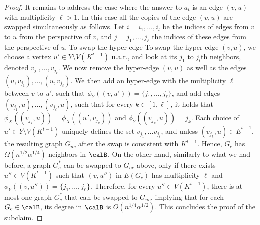\begin{proof}
      It remains to address the case where the answer to $a_t$ is an edge $(v,u)$ with multiplicity $\ell>1$. 
      In this case all the copies of the edge $(v,u)$ are swapped simultaneously as follows. Let $i=i_1, \ldots, i_l$ be the indices of edges from $v$ to $u$ from the perspective of $v$, and $j=j_1, \ldots, j_{\ell}$ the indices of these edges from the perspective of $u$. To swap the hyper-edge To swap the hyper-edge $(v,u)$, we choose a vertex $u'\in Y\setminus V(K^{t-1})$ u.a.r., and look at its $j_1$ to $j_l$th neighbors,  denoted  $v_{j_1}, \ldots, v_{j_{\ell}}$. We now remove the hyper-edge $(v,u)$ as well as the edges $(u, v_{j_1}), \ldots, (u,v_{j_{\ell}})$. We then  add an hyper-edge with the  multiplicity  $\ell$ between $v$ to $u'$, such that $\phi_Y((v,u'))=\{j_1, \ldots, j_{\ell}\}$, and add edges $(v_{j_1}, u), \ldots, (v_{j_{\ell}}, u)$, such that for every $k\in [1,\ell]$, it holds that  $\phi_X((v_{j_k},u))=\phi_X((u', v_{j_{k}}))$ and $\phi_Y((v_{j_k},u))=j_k$.
      Each choice of $u'\in Y\setminus V(K^{t-1})$ uniquely defines the set $v_{j_1}, \ldots v_{j_\ell}$, and unless $(v_{j_k},u)\in \bar{E}^{t-1}$, the resulting graph $G_{nc}$ after the swap is consistent with $K^{t-1}$. Hence,  $G_c$ has $\Omega(n^{1/2}\alpha^{1/4})$ neighbors in $\calB$.
    On the other hand, similarly to what we had before, a graph $G_{c}^*$ can be swapped to $G_{nc}$ above, only if there exists $u''\in V(K^{t-1})$ such that    $(v,u'')$ in $E(G_{c})$ has multiplicity $\ell$ and $\phi_Y((v,u''))=\{j_1, \ldots, j_{\ell}\}$. Therefore, for every  $u''\in V(K^{t-1})$, there  is at most  one graph $G_c^*$ that can be swapped to $G_{nc}$, implying that for each $G_c\in \calB$, its degree in $\calB$ is $O(n^{1/4}\alpha^{1/2})$. This concludes the proof of the subclaim.

      
          

\end{proof}
\fi



